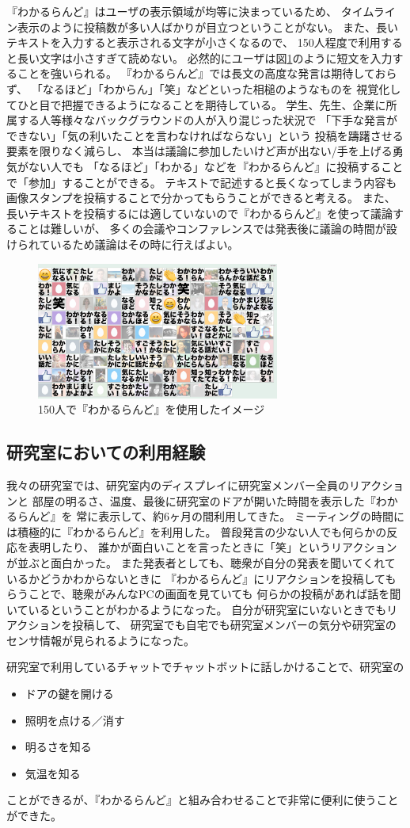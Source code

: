 『わかるらんど』はユーザの表示領域が均等に決まっているため、
タイムライン表示のように投稿数が多い人ばかりが目立つということがない。
また、長いテキストを入力すると表示される文字が小さくなるので、
150人程度で利用すると長い文字は小さすぎて読めない。
必然的にユーザは図\ref{wakaruland150}のように短文を入力することを強いられる。
『わかるらんど』では長文の高度な発言は期待しておらず、
「なるほど」「わからん」「笑」などといった相槌のようなものを
視覚化してひと目で把握できるようになることを期待している。
学生、先生、企業に所属する人等様々なバックグラウンドの人が入り混じった状況で
「下手な発言ができない」「気の利いたことを言わなければならない」という
投稿を躊躇させる要素を限りなく減らし、
本当は議論に参加したいけど声が出ない/手を上げる勇気がない人でも
「なるほど」「わかる」などを『わかるらんど』に投稿することで「参加」することができる。
テキストで記述すると長くなってしまう内容も
画像スタンプを投稿することで分かってもらうことができると考える。
また、長いテキストを投稿するには適していないので『わかるらんど』を使って議論することは難しいが、
多くの会議やコンファレンスでは発表後に議論の時間が設けられているため議論はその時に行えばよい。

\begin{figure}[h]
\centering
\includegraphics[width=8cm]{images/wakaruland150.png}
\caption{150人で『わかるらんど』を使用したイメージ}
\label{wakaruland150}
\end{figure}

\subsection{研究室においての利用経験}
我々の研究室では、研究室内のディスプレイに研究室メンバー全員のリアクションと
部屋の明るさ、温度、最後に研究室のドアが開いた時間を表示した『わかるらんど』を
常に表示して、約6ヶ月の間利用してきた。
ミーティングの時間には積極的に『わかるらんど』を利用した。
普段発言の少ない人でも何らかの反応を表明したり、
誰かが面白いことを言ったときに「笑」というリアクションが並ぶと面白かった。
また発表者としても、聴衆が自分の発表を聞いてくれているかどうかわからないときに
『わかるらんど』にリアクションを投稿してもらうことで、聴衆がみんなPCの画面を見ていても
何らかの投稿があれば話を聞いているということがわかるようになった。
自分が研究室にいないときでもリアクションを投稿して、
研究室でも自宅でも研究室メンバーの気分や研究室のセンサ情報が見られるようになった。

研究室で利用しているチャットでチャットボットに話しかけることで、研究室の
\begin{itemize}
  \item ドアの鍵を開ける
  \item 照明を点ける／消す
  \item 明るさを知る
  \item 気温を知る
\end{itemize}
ことができるが、『わかるらんど』と組み合わせることで非常に便利に使うことができた。


